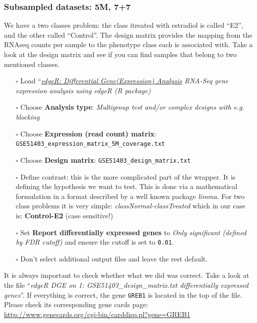 \subsubsection{Subsampled datasets: 5M, 7+7}
We have a two classes problem: the class itreated with estradiol is called ``E2'', and the other called ``Control''.
The design matrix provides the mapping from the RNAseq counts per sample to the phenotype class each is associated with.
Take a look at the design matrix and see if you can find samples that belong to two mentioned classes.
\begin{itemize}
	\item [$\square$] Load ``\textit{\underline{edgeR: Differential Gene(Expression) Analysis} RNA-Seq gene expression analysis using edgeR (R package)}
	\item [$\square$] Choose \textbf{Analysis type}: \textit{Multigroup test and/or complex designs with e.g. blocking}
	\item [$\square$] Choose \textbf{Expression (read count) matrix}: {\scriptsize \verb| GSE51403_expression_matrix_5M_coverage.txt|}
	\item [$\square$] Choose \textbf{Design matrix}: \verb|GSE51403_design_matrix.txt|
	\item [$\square$] Define contrast: this is the more complicated part of the wrapper. It is defining the hypothesis we want to test. This is done via a mathematical formulation in a format described by a well known package \textit{limma}. For two class problems it is very simple: \textit{classNormal-classTreated} which in our case is: \textbf{Control-E2} (case sensitive!)
	\item [$\square$] Set \textbf{Report differentially expressed genes} to \textit{Only significant (defined by FDR cutoff)} and ensure the cutoff is set to \verb|0.01|.
	\item [$\square$] Don't select additional output files and leave the rest default.
\end{itemize}
It is always important to check whether what we did was correct. Take a look at the file ``\textit{edgeR DGE on 1: GSE51403\_design\_matrix.txt differentially expressed genes}''. If everything is correct, the gene \verb|GREB1| is located in the top of the file. Please check its corresponding gene cards page:\\
\url{http://www.genecards.org/cgi-bin/carddisp.pl?gene=GREB1}\\

